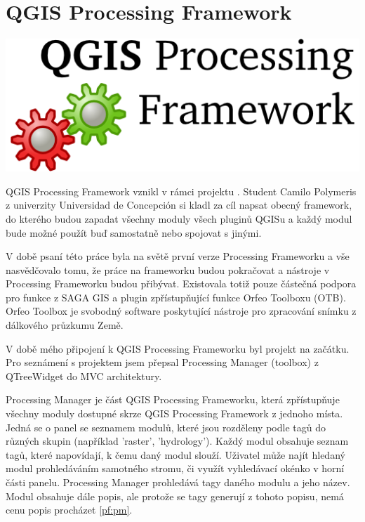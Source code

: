 \newpage
{}
\section{QGIS Processing Framework}
\nocite{pf:www}


\begin{center}
		\includegraphics[scale=0.30]{pictures/qgis_pf}
\end{center}

QGIS Processing Framework vznikl v rámci projektu  . Student Camilo Polymeris z univerzity Universidad de Concepción si kladl za cíl napsat obecný framework, do kterého budou zapadat všechny moduly všech pluginů QGISu a každý modul bude možné použít buď samostatně nebo spojovat s jinými.

V době psaní této práce byla na světě první verze Processing Frameworku a vše nasvědčovalo tomu, že práce na frameworku budou pokračovat a nástroje v Processing Frameworku budou přibývat. Existovala totiž pouze částečná  podpora pro funkce z SAGA GIS a plugin zpřístupňující funkce  Orfeo Toolboxu (OTB). Orfeo Toolbox je svobodný software poskytující nástroje pro zpracování snímku z  dálkového průzkumu Země.

V době mého připojení k QGIS Processing Frameworku byl projekt na začátku. Pro seznámení s projektem jsem přepsal Processing Manager (toolbox) z QTreeWidget do MVC architektury.

Processing Manager je část QGIS Processing Frameworku, která zpřístupňuje všechny moduly dostupné skrze QGIS Processing Framework z jednoho místa. Jedná se o panel se seznamem modulů, které jsou rozděleny podle tagů do různých skupin (například 'raster', 'hydrology'). Každý modul obsahuje seznam tagů, které napovídají, k čemu daný modul slouží. Uživatel může najít hledaný modul prohledáváním samotného stromu, či využít vyhledávací okénko v horní části panelu. Processing Manager prohledává tagy daného modulu a jeho název. Modul obsahuje dále popis, ale protože se tagy generují z tohoto popisu, nemá cenu popis procházet \figurename \ref{pf:pm}.

